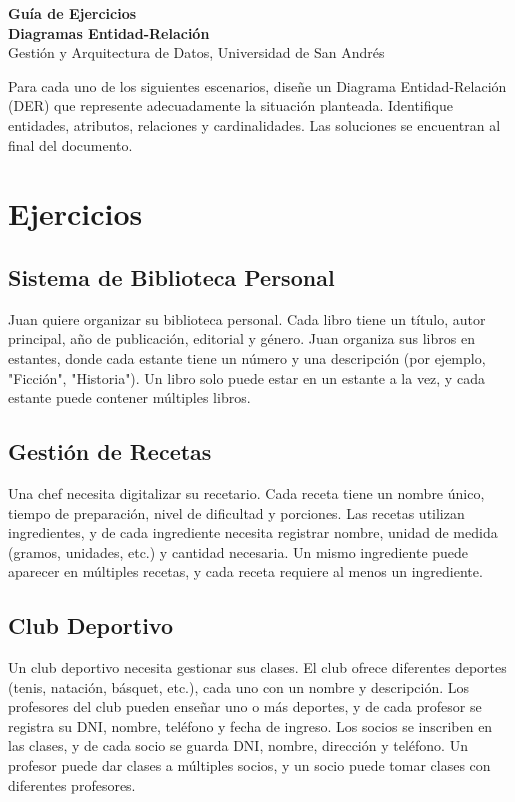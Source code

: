 \documentclass[12pt]{article}
\begin{document}
\begin{center}
  {\LARGE \textbf{Guía de Ejercicios \\ Diagramas Entidad-Relación}}\\[0.5em]
  {Gestión y Arquitectura de Datos, Universidad de San Andrés}
\end{center}

Para cada uno de los siguientes escenarios, diseñe un Diagrama Entidad-Relación (DER) que represente adecuadamente la situación planteada. Identifique entidades, atributos, relaciones y cardinalidades. Las soluciones se encuentran al final del documento.

\section{Ejercicios}

\subsection{Sistema de Biblioteca Personal}
Juan quiere organizar su biblioteca personal. Cada libro tiene un título, autor principal, año de publicación, editorial y género. Juan organiza sus libros en estantes, donde cada estante tiene un número y una descripción (por ejemplo, "Ficción", "Historia"). Un libro solo puede estar en un estante a la vez, y cada estante puede contener múltiples libros.

\subsection{Gestión de Recetas}
Una chef necesita digitalizar su recetario. Cada receta tiene un nombre único, tiempo de preparación, nivel de dificultad y porciones. Las recetas utilizan ingredientes, y de cada ingrediente necesita registrar nombre, unidad de medida (gramos, unidades, etc.) y cantidad necesaria. Un mismo ingrediente puede aparecer en múltiples recetas, y cada receta requiere al menos un ingrediente.

\subsection{Club Deportivo}
Un club deportivo necesita gestionar sus clases. El club ofrece diferentes deportes (tenis, natación, básquet, etc.), cada uno con un nombre y descripción. Los profesores del club pueden enseñar uno o más deportes, y de cada profesor se registra su DNI, nombre, teléfono y fecha de ingreso. Los socios se inscriben en las clases, y de cada socio se guarda DNI, nombre, dirección y teléfono. Un profesor puede dar clases a múltiples socios, y un socio puede tomar clases con diferentes profesores.
\end{document}
